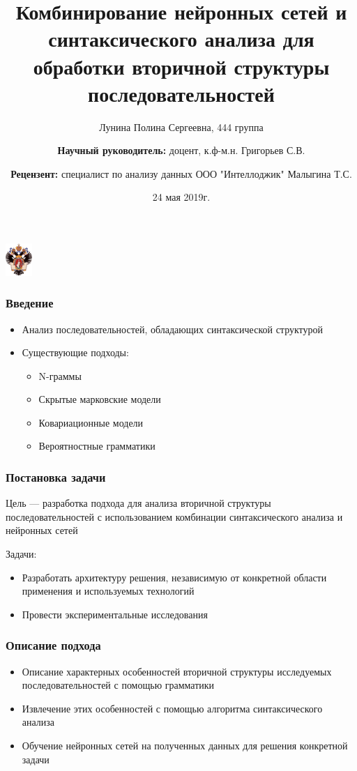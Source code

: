 \documentclass{beamer}
\title[]{Комбинирование нейронных сетей и синтаксического анализа для обработки вторичной структуры последовательностей}
\institute[СПбГУ]{
Санкт-Петербургский государственный университет \\
Кафедра системного программирования }
\author[Лунина Полина]{Лунина Полина Сергеевна, 444 группа \\
  \and  
    {\bfseries Научный руководитель:} доцент, к.ф-м.н. Григорьев С.В.
	\and
	{\bfseries Рецензент:} специалист по анализу данных 
	\linebreak ООО "Интеллоджик"  Малыгина Т.С.}
\date{24 мая 2019г.}
\begin{document}
{
\begin{frame}
\begin{center}
{\includegraphics[width=1cm]{pics/logo.jpg}}
\end{center}
\titlepage
\end{frame}
}

\begin{frame}\frametitle{Введение}
\begin{itemize}
    \item Анализ последовательностей, обладающих синтаксической структурой
    \item Существующие подходы:
    \begin{itemize}
        \item N-граммы
        \item Скрытые марковские модели
        \item Ковариационные модели
        \item Вероятностные грамматики
    \end{itemize}
\end{itemize}
\end{frame}

\begin{frame}\frametitle{Постановка задачи}
Цель --- разработка подхода для анализа вторичной структуры последовательностей с использованием комбинации синтаксического анализа и нейронных сетей

\vspace{5\onelineskip}

Задачи:
\begin{itemize}
    \item Разработать архитектуру решения, независимую от конкретной области применения и используемых технологий
    \item Провести экспериментальные исследования
\end{itemize}
\end{frame}

\begin{frame}\frametitle{Описание подхода}
\begin{itemize}
    \item Описание характерных особенностей вторичной структуры исследуемых последовательностей с помощью грамматики
    \item Извлечение этих особенностей с помощью алгоритма синтаксического анализа
    \item Обучение нейронных сетей на полученных данных для решения конкретной задачи
\end{itemize}
\end{frame}
\end{document}
